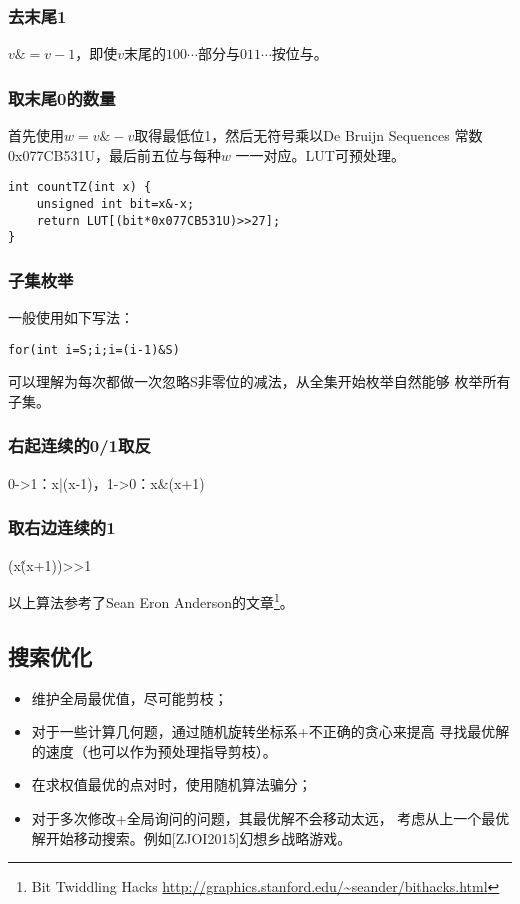 \subsubsection{去末尾1}
$v\&=v-1$，即使$v$末尾的$100\cdots$部分与$011\cdots$按位与。
\subsubsection{取末尾0的数量}
首先使用$w=v\&-v$取得最低位1，然后无符号乘以De Bruijn Sequences
常数0x077CB531U，最后前五位与每种$w$
一一对应。LUT可预处理。
\begin{lstlisting}
int countTZ(int x) {
    unsigned int bit=x&-x;
    return LUT[(bit*0x077CB531U)>>27];
}
\end{lstlisting}
\subsubsection{子集枚举}
一般使用如下写法：
\begin{lstlisting}
for(int i=S;i;i=(i-1)&S)
\end{lstlisting}
可以理解为每次都做一次忽略S非零位的减法，从全集开始枚举自然能够
枚举所有子集。
\subsubsection{右起连续的0/1取反}
0->1：x|(x-1)，1->0：x\&(x+1)
\subsubsection{取右边连续的1}
(x\^(x+1))>>1

以上算法参考了Sean Eron Anderson的文章\footnote{
    Bit Twiddling Hacks
    \url{http://graphics.stanford.edu/\~seander/bithacks.html}
}。
\subsection{搜索优化}
\begin{itemize}
    \item 维护全局最优值，尽可能剪枝；
    \item 对于一些计算几何题，通过随机旋转坐标系+不正确的贪心来提高
    寻找最优解的速度（也可以作为预处理指导剪枝）。
    \item 在求权值最优的点对时，使用随机算法骗分；
    \item 对于多次修改+全局询问的问题，其最优解不会移动太远，
    考虑从上一个最优解开始移动搜索。例如[ZJOI2015]幻想乡战略游戏。
\end{itemize}
